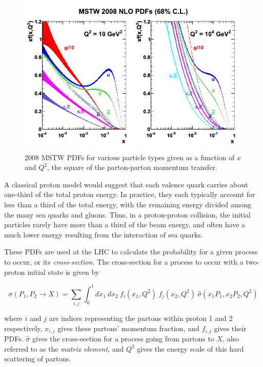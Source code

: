 \begin{centering}
\begin{figure}[bth]
\myfloatalign
\includegraphics[width=.85\linewidth]{figures/theory/mstw2008nlo68cl_allpdfs.png}
\caption{2008 MSTW \acp{PDF} for various particle types given as a function of $x$ and $Q^2$, the square of the parton-parton momentum transfer. \cite{0901.0002}}
\label{fig:pdf}
\end{figure}
\end{centering}

A classical proton model would suggest that each valence quark carries about one-third of the total proton energy. In practice, they each typically account for less than a third of the total energy, with the remaining energy divided among the many sea quarks and gluons. Thus, in a proton-proton collision, the initial particles rarely have more than a third of the beam energy, and often have a much lower energy resulting from the interaction of sea quarks. 

These \acp{PDF} are used at the \ac{LHC} to calculate the probability for a given process to occur, or its \textit{cross-section}. The cross-section for a process to occur with a two-proton initial state is given by 

\begin{equation}
\sigma(P_1, P_2 \rightarrow X) = \sum_{i,j} \int_0^1 dx_1\ dx_2\ f_i(x_1, Q^2)\ f_j(x_2, Q^2) \ \hat{\sigma}(x_1P_1, x_2P_2, Q^2 )
\end{equation}

where $i$ and $j$ are indices representing the partons within proton 1 and 2 respectively, $x_{i,j}$ gives these partons' momentum fraction, and $f_{i,j}$ gives their \acp{PDF}. $\hat{\sigma}$ gives the cross-section for a process going from partons to $X$, also referred to as the \textit{matrix element}, and $Q^2$ gives the energy scale of this hard scattering of partons. 

